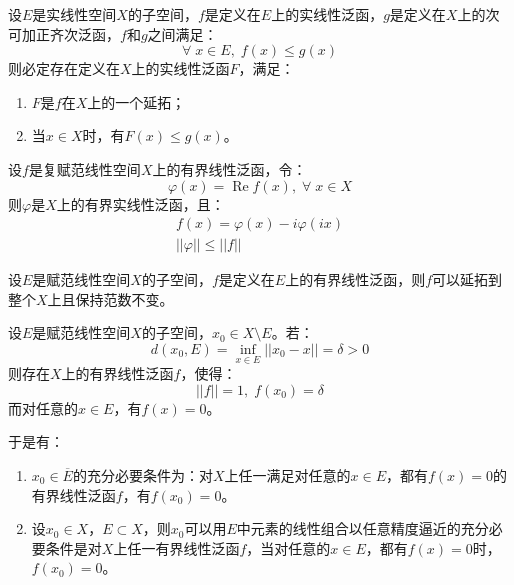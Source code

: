 \begin{theorem}
	设$E$是实线性空间$X$的子空间，$f$是定义在$E$上的实线性泛函，$g$是定义在$X$上的次可加正齐次泛函，$f$和$g$之间满足：
	\begin{equation*}
		\forall\;x\in E,\;f(x)\leqslant g(x)
	\end{equation*}
	则必定存在定义在$X$上的实线性泛函$F$，满足：
	\begin{enumerate}
		\item $F$是$f$在$X$上的一个延拓；
		\item 当$x\in X$时，有$F(x)\leqslant g(x)$。
	\end{enumerate}
\end{theorem}
\begin{corollary}
	设$f$是复赋范线性空间$X$上的有界线性泛函，令：
	\begin{equation*}
		\varphi(x)=\operatorname{Re}f(x),\;\forall\;x\in X
	\end{equation*}
	则$\varphi$是$X$上的有界实线性泛函，且：
	\begin{gather*}
		f(x)=\varphi(x)-i\varphi(ix) \\
		||\varphi||\leqslant||f||
	\end{gather*}
\end{corollary}
\begin{theorem}
	设$E$是赋范线性空间$X$的子空间，$f$是定义在$E$上的有界线性泛函，则$f$可以延拓到整个$X$上且保持范数不变。
\end{theorem}
\begin{corollary}
	设$E$是赋范线性空间$X$的子空间，$x_0\in X\setminus E$。若：
	\begin{equation*}
		d(x_0,E)=\inf_{x\in E}||x_0-x||=\delta>0
	\end{equation*}
	则存在$X$上的有界线性泛函$f$，使得：
	\begin{equation*}
		||f||=1,\;f(x_0)=\delta
	\end{equation*}
	而对任意的$x\in E$，有$f(x)=0$。\par
	于是有：
	\begin{enumerate}
		\item $x_0\in\overline{E}$的充分必要条件为：对$X$上任一满足对任意的$x\in E$，都有$f(x)=0$的有界线性泛函$f$，有$f(x_0)=0$。
		\item 设$x_0\in X$，$E\subset X$，则$x_0$可以用$E$中元素的线性组合以任意精度逼近的充分必要条件是对$X$上任一有界线性泛函$f$，当对任意的$x\in E$，都有$f(x)=0$时，$f(x_0)=0$。
	\end{enumerate}
\end{corollary}
